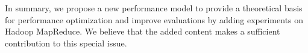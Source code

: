 \documentclass[12pt,reqno]{amsart}
\theoremstyle{plain}
\numberwithin{equation}{section}
\theoremstyle{plain}
\numberwithin{equation}{section}
\begin{document}
In summary, we propose a new performance model to provide a theoretical basis for performance optimization and improve evaluations by adding experiments on Hadoop MapReduce. 
We believe that the added content makes a sufficient contribution to this special issue.



\end{document}
